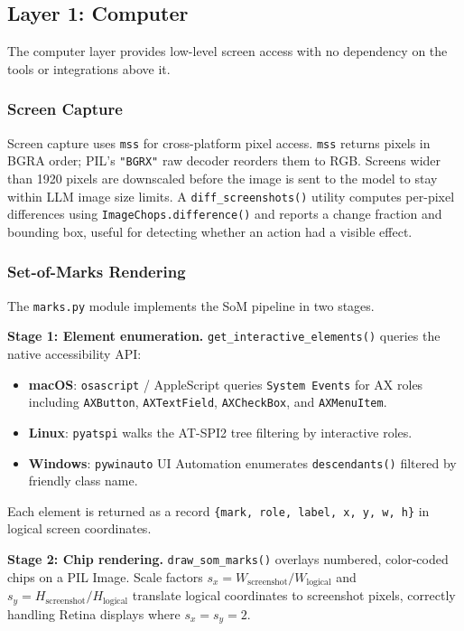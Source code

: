 \documentclass[11pt]{article}
\begin{document}
\subsection{Layer 1: Computer}

The computer layer provides low-level screen access with no dependency on the tools or integrations above it.

\subsubsection{Screen Capture}

Screen capture uses \texttt{mss} for cross-platform pixel access. \texttt{mss} returns pixels in BGRA order; PIL's \texttt{"BGRX"} raw decoder reorders them to RGB. Screens wider than 1920 pixels are downscaled before the image is sent to the model to stay within LLM image size limits. A \texttt{diff\_screenshots()} utility computes per-pixel differences using \texttt{ImageChops.difference()} and reports a change fraction and bounding box, useful for detecting whether an action had a visible effect.

\subsubsection{Set-of-Marks Rendering}

The \texttt{marks.py} module implements the SoM pipeline in two stages.

\textbf{Stage 1: Element enumeration.} \texttt{get\_interactive\_elements()} queries the native accessibility API:
\begin{itemize}
    \item \textbf{macOS}: \texttt{osascript} / AppleScript queries \texttt{System Events} for AX roles including \texttt{AXButton}, \texttt{AXTextField}, \texttt{AXCheckBox}, and \texttt{AXMenuItem}.
    \item \textbf{Linux}: \texttt{pyatspi} walks the AT-SPI2 tree filtering by interactive roles.
    \item \textbf{Windows}: \texttt{pywinauto} UI Automation enumerates \texttt{descendants()} filtered by friendly class name.
\end{itemize}
Each element is returned as a record \texttt{\{mark, role, label, x, y, w, h\}} in logical screen coordinates.

\textbf{Stage 2: Chip rendering.} \texttt{draw\_som\_marks()} overlays numbered, color-coded chips on a PIL Image. Scale factors $s_x = W_{\text{screenshot}} / W_{\text{logical}}$ and $s_y = H_{\text{screenshot}} / H_{\text{logical}}$ translate logical coordinates to screenshot pixels, correctly handling Retina displays where $s_x = s_y = 2$.
\end{document}
